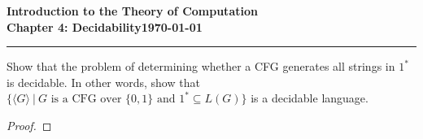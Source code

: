 \documentclass[11pt]{article}
\newcommand{\dated}{\today}
\begin{document}
\textbf{Introduction to the Theory of
Computation}\hfill\textbf{\myname}\\[0.01in]
\textbf{Chapter 4: Decidability}\hfill\textbf{\dated}\\
\smallskip\hrule\bigskip

\begin{problem}{4.15}
Show that the problem of determining whether a CFG generates all strings in $1^{*}$ is decidable. In other words, show that $\{\langle G \rangle \ | \ G \text{ is a CFG over } \{0,1\} \text{ and } 1^{*} \subseteq L(G)\}$ is a decidable language.
\end{problem}

\begin{proof}
\end{proof}
\end{document}
